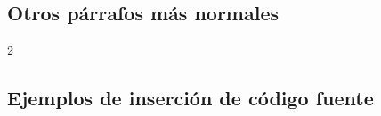 	\lipsum[115]

\subsection{Otros párrafos más normales}

	\lipsum[7]


	\lipsum[2]

	\begin{multicols}{2}

		\lipsum[4]

		
		\lipsum[5]

	\end{multicols}

\subsection{Ejemplos de inserción de código fuente}

	\newcommand{\insertsrcmanual}[2]{\href{https://template-latex.github.io/informe.html?srctype=#1\#hlp-srccode}{#2}}

